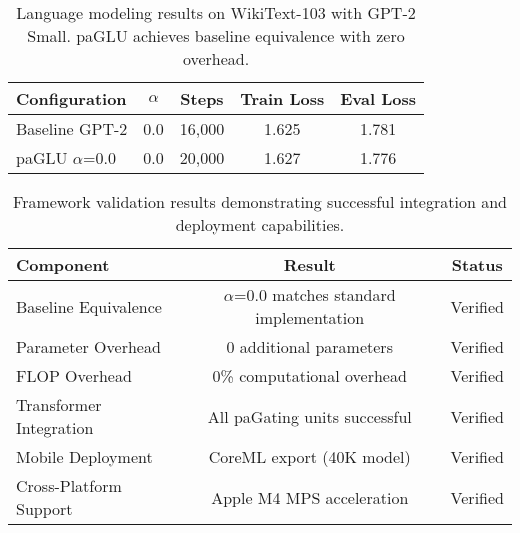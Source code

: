 \begin{table}[ht]
\centering
\caption{Language modeling results on WikiText-103 with GPT-2 Small. paGLU achieves baseline equivalence with zero overhead.}
\label{tab:verified_nlp_results}
\begin{tabular}{lcccc}
\toprule
Configuration & $\alpha$ & Steps & Train Loss & Eval Loss \\
\midrule
Baseline GPT-2 & 0.0 & 16,000 & 1.625 & 1.781 \\
paGLU $\alpha$=0.0 & 0.0 & 20,000 & 1.627 & 1.776 \\
\bottomrule
\end{tabular}
\end{table}

\begin{table}[ht]
\centering
\caption{Framework validation results demonstrating successful integration and deployment capabilities.}
\label{tab:framework_validation}
\begin{tabular}{lcc}
\toprule
Component & Result & Status \\
\midrule
Baseline Equivalence & $\alpha$=0.0 matches standard implementation & Verified \\
Parameter Overhead & 0 additional parameters & Verified \\
FLOP Overhead & 0\% computational overhead & Verified \\
Transformer Integration & All paGating units successful & Verified \\
Mobile Deployment & CoreML export (40K model) & Verified \\
Cross-Platform Support & Apple M4 MPS acceleration & Verified \\
\bottomrule
\end{tabular}
\end{table} 